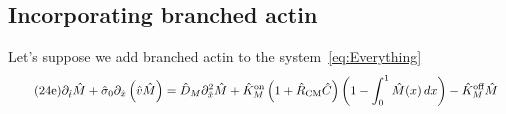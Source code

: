 \documentclass[11pt]{article}
\newcommand{\6}[1]{#1_{\text{6}}}
\newcommand{\3}[1]{#1_{\text{3}}}
\begin{document}
\subsection{Incorporating branched actin}
Let's suppose we add branched actin to the system\ \eqref{eq:Everything}
\begin{subequations} 
\begin{align}
\tag{24e}
\label{eq:WithBA}
&\partial_{\hat{t}} \hat{M} +\hat{\sigma}_0  \partial_{\hat{x}} \left(\hat{v} \hat{M} \right) =\hat{D}_M \partial_{\hat{x}}^2 \hat{M} +\hat{K}^\text{on}_M \left(1+\hat{R}_\text{CM} \hat C\right) \left(1-\int_0^1  \hat{M}(x) \, dx\right)- \hat{K}^\text{off}_M \hat{M}
\end{align}
\end{subequations}





\end{document}
